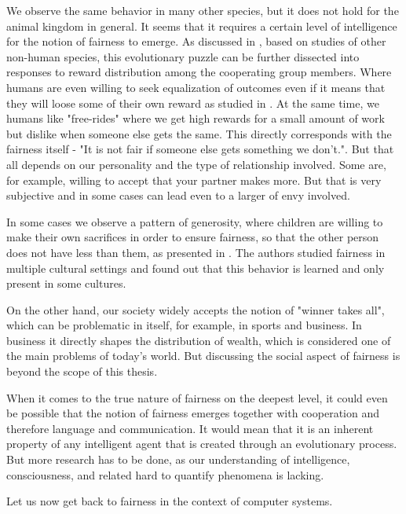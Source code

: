 We observe the same behavior in many other species, but it does not hold for the animal kingdom in general. It seems that it requires a certain level of intelligence for the notion of fairness to emerge. As discussed in \cite{brosnan2014evolution}, based on studies of other non-human species, this evolutionary puzzle can be further dissected into responses to reward distribution among the cooperating group members. Where humans are even willing to seek equalization of outcomes even if it means that they will loose some of their own reward as studied in \cite{willing_to_pay_to_equality}. At the same time, we humans like "free-rides" where we get high rewards for a small amount of work but dislike when someone else gets the same. This directly corresponds with the fairness itself - "It is not fair if someone else gets something we don't.". But that all depends on our personality and the type of relationship involved. Some are, for example, willing to accept that your partner makes more. But that is very subjective and in some cases can lead even to a larger of envy involved.

In some cases we observe a pattern of generosity, where children are willing to make their own sacrifices in order to ensure fairness, so that the other person does not have less than them, as presented in \cite{children_generocity_blake}. The authors studied fairness in multiple cultural settings and found out that this behavior is learned and only present in some cultures.

On the other hand, our society widely accepts the notion of "winner takes all", which can be problematic in itself, for example, in sports and business. In business it directly shapes the distribution of wealth, which is considered one of the main problems of today's world. But discussing the social aspect of fairness is beyond the scope of this thesis.


When it comes to the true nature of fairness on the deepest level, it could even be possible that the notion of fairness emerges together with cooperation and therefore language and communication. It would mean that it is an inherent property of any intelligent agent that is created through an evolutionary process. But more research has to be done, as our understanding of intelligence, consciousness, and related hard to quantify phenomena is lacking.\newline

Let us now get back to fairness in the context of computer systems.









